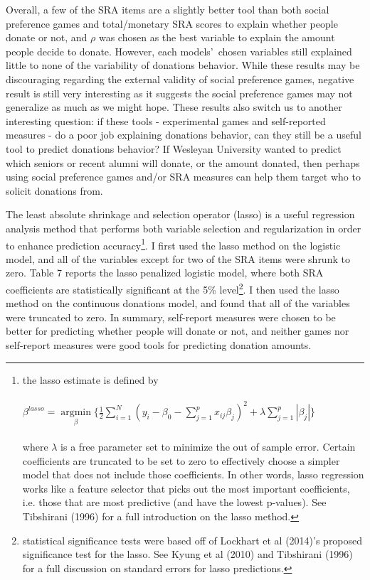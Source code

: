 \documentclass[12pt]{article}
\begin{document}
{Overall, a few of the SRA items are a slightly better tool than both social preference games and total/monetary SRA scores to explain whether people donate or not, and \(\rho\) was chosen as the best variable to explain the amount people decide to donate. However, each models\rq \ chosen variables still explained little to none of the variability of donations behavior. While these results may be discouraging regarding the external validity of social preference games, {\color{blue} negative result is still very interesting as it suggests the social preference games may not generalize as much as we might hope.} These results also switch us to another interesting question: if these tools - experimental games and self-reported measures - do a poor job explaining donations behavior, can they still be a useful tool to predict donations behavior? If Wesleyan University wanted to predict which seniors or recent alumni will donate, or the amount donated, then perhaps using social preference games and/or SRA measures can help them target who to solicit donations from.

The least absolute shrinkage and selection operator (lasso) is a useful regression analysis method that performs both variable selection and regularization in order to enhance prediction accuracy\footnote{ 
the lasso estimate is defined by \\ \\
\( \beta^{lasso}=\mathop\mathrm{argmin}\limits_{\beta} \{ \frac{1}{2} \sum_{i=1}^{N} (y_{i} - \beta_{0} - \sum_{j=1}^{p}x_{ij}\beta _{j})^{2}+\lambda\sum_{j=1}^{p}|\beta _{j}|\} \) \\ \\
where \(\lambda\) is a free parameter set to minimize the out of sample error. Certain coefficients are truncated to be set to zero to effectively choose a simpler model that does not include those coefficients. In other words, lasso regression works like a feature selector that picks out the most important coefficients, i.e. those that are most predictive (and have the lowest p-values). See Tibshirani (1996) for a full introduction on the lasso method.}.
I first used the lasso method on the logistic model, and all of the variables except for two of the SRA items were shrunk to zero. Table 7 reports the lasso penalized logistic model, where both SRA coefficients are statistically significant at the 5\% level\footnote{statistical significance tests were based off of Lockhart et al (2014)\rq s proposed significance test for the lasso. See Kyung et al (2010) and Tibshirani (1996) for a full discussion on standard errors for lasso predictions.}. I then used the lasso method on the continuous donations model, and found that all of the variables were truncated to zero. In summary, self-report measures were chosen to be better for predicting whether people will donate or not, and neither games nor self-report measures were good tools for predicting donation amounts.



}
\end{document}
